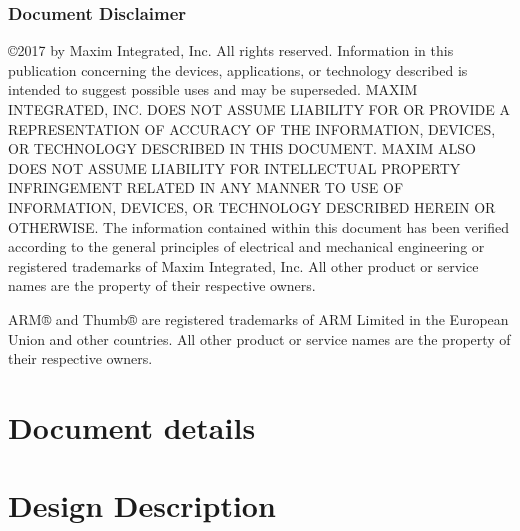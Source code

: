 \documentclass[twoside]{book}
\makeatletter
\newcommand\docyear{2017 }
\newcommand{\+}{\discretionary{\mbox{\scriptsize$\hookleftarrow$}}{}{}}
\renewcommand{\paragraph}{%
  \@startsection{paragraph}{4}{0ex}{-1.0ex}{1.0ex}{%
    \normalfont\normalsize\bfseries\SS@parafont%
  }%
}
\newcommand{\clearemptydoublepage}{%
  \newpage{\pagestyle{empty}\cleardoublepage}%
}
\let\cleardoublepage\clearpage
\let\oldchapter\chapter
\let\oldsection\section
\let\oldsubsection\subsection
\let\oldsubsubsection\subsubsection
\newcommand\mysection\oldsubsection
\newcommand\mysubsection\oldsubsubsection
\newcommand\mysubsubsection\paragraph
\newcommand\mysectionh\oldchapter
\newcommand\mysubsectionh\oldsection
\newcommand\mysubsubsectionh\oldsubsection
\newcommand\shiftleveldown{%
\makeatletter%
\renewcommand{\section}{\mysection}%
\renewcommand{\subsection}{\mysubsection}%
\renewcommand{\subsubsection}{\mysubsubsection}%
\makeatother%
}
\newcommand\restorelevel{%
\makeatletter%
\renewcommand{\section}{\oldsection}%
\renewcommand{\subsection}{\oldsubsection}%
\renewcommand{\subsubsection}{\oldsubsubsection}%
\makeatother%
}
\newcommand\shiftlevelup{%
\makeatletter%
\renewcommand{\section}{\mysectionh}%
\renewcommand{\subsection}{\mysubsectionh}%
\renewcommand{\subsubsection}{\mysubsubsectionh}%
\makeatother%
}
\makeatother
\begin{document}
\subsection*{Document Disclaimer}
©\docyear by Maxim Integrated, Inc. All rights reserved. Information in this publication concerning the devices, applications, or technology described is intended to suggest possible uses and may be superseded. MAXIM INTEGRATED, INC. DOES NOT ASSUME LIABILITY FOR OR PROVIDE A REPRESENTATION OF ACCURACY OF THE INFORMATION, DEVICES, OR TECHNOLOGY DESCRIBED IN THIS DOCUMENT. MAXIM ALSO DOES NOT ASSUME LIABILITY FOR INTELLECTUAL PROPERTY INFRINGEMENT RELATED IN ANY MANNER TO USE OF INFORMATION, DEVICES, OR TECHNOLOGY DESCRIBED HEREIN OR OTHERWISE. The information contained within this document has been verified according to the general principles of electrical and mechanical engineering or registered trademarks of Maxim Integrated, Inc. All other product or service names are the property of their respective owners.

ARM® and Thumb® are registered trademarks of ARM Limited in the European Union and other countries. All other product or service names are the property of their respective owners.


\clearemptydoublepage
{}
\tableofcontents
\clearemptydoublepage
{}
\hypersetup{pageanchor=true}


\chapter{Document details}



\shiftlevelup
\label{index}\hypertarget{index}{}
\restorelevel

\chapter{Design Description}










\shiftleveldown





\restorelevel
\end{document}
